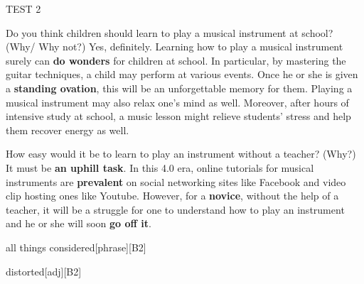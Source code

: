 \begin{glossarymc}[Cambridge 6]
\begin{test}{TEST 2}
    \begin{qa}{Do you think children should learn to play a musical instrument at school? (Why/ Why not?)}
    Yes, definitely. Learning how to play a musical instrument surely can \textbf{do wonders} for children at school. In particular, by mastering the guitar techniques, a child may perform at various events. Once he or she is given a \textbf{standing ovation}, this will be an unforgettable memory for them. Playing a musical instrument may also relax one's mind as well. Moreover, after hours of intensive study at school, a music lesson might relieve students' stress and help them recover energy as well.
    \end{qa}

    \begin{qa}{How easy would it be to learn to play an instrument without a teacher? (Why?)}
    It must be \textbf{an uphill task}. In this 4.0 era, online tutorials for musical instruments are \textbf{prevalent} on social networking sites like Facebook and video clip hosting ones like Youtube. However, for a \textbf{novice}, without the help of a teacher, it will be a struggle for one to understand how to play an instrument and he or she will soon \textbf{go off it}.
    \end{qa}

        \begin{VocabExplain}[Part 1]
            \begin{ExplainCard}{all things considered}[phrase][B2]
            \end{ExplainCard}

        \begin{ExplainCard}{distorted}[adj][B2]
        \end{ExplainCard}


\end{VocabExplain}
\end{test}
\end{glossarymc}
